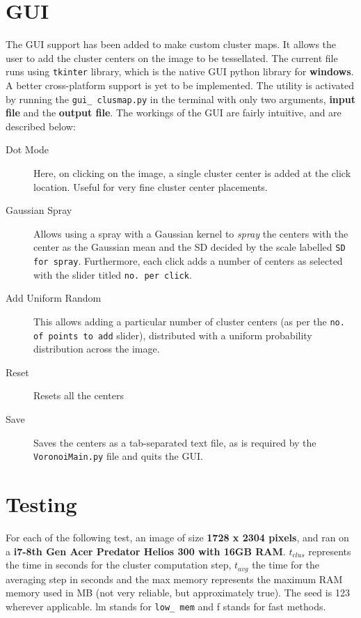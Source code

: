 \documentclass[15pt]{article}
\begin{document}
\section{GUI}
The GUI support has been added to make custom cluster maps. It allows the user to add the cluster centers on the image to be tessellated. The current file runs using \texttt{tkinter} library, which is the native GUI python library for \textbf{windows}. A better cross-platform support is yet to be implemented.
The utility is activated by running the \texttt{gui\_ clusmap.py} in the terminal with only two arguments, \textbf{input file} and the \textbf{output file}. The workings of the GUI are fairly intuitive, and are described below:
\begin{description}
\item [Dot Mode] Here, on clicking on the image, a single cluster center is added at the click location. Useful for very fine cluster center placements.
\item [Gaussian Spray] Allows using a spray with a Gaussian kernel to \emph{spray} the centers with the center as the Gaussian mean and the SD decided by the scale labelled \texttt{SD for spray}. Furthermore, each click adds a number of centers as selected with the slider titled \texttt{no. per click}.
\item [Add Uniform Random] This allows adding a particular number of cluster centers (as per the \texttt{no. of points to add} slider), distributed with a uniform probability distribution across the image.
\item [Reset] Resets all the centers
\item [Save] Saves the centers as a tab-separated text file, as is required by the \texttt{VoronoiMain.py} file and quits the GUI.
\end{description}
\newpage
\section{Testing}
For each of the following test, an image of size \textbf{1728 x 2304 pixels}, and ran on a \textbf{i7-8th Gen Acer Predator Helios 300 with 16GB RAM}. $t_{clus}$ represents the time in seconds for the cluster computation step, $t_{avg}$ the time for the averaging step in seconds and the max memory represents the maximum RAM memory used in MB (not very reliable, but approximately true). The seed is 123 wherever applicable. lm stands for \texttt{low\_ mem} and f stands for fast methods.
\end{document}
